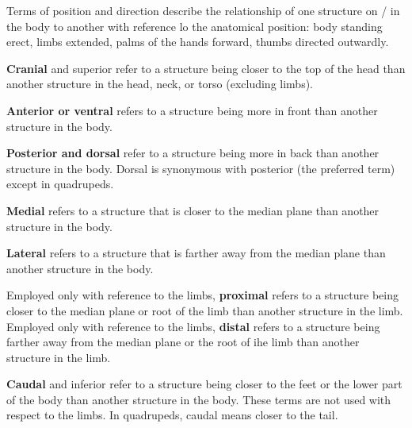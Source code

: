 \areaset[1cm]{18cm}{30cm} \thispagestyle{empty}
\enlargethispage{32pt} \thispagestyle{empty}
\hspace{-0.4cm}
\begin{minipage}{6cm}
	Terms of position and direction describe the relationship of one structure on / in the body to another with reference lo the anatomical position: body standing erect, limbs extended, palms of the hands forward, thumbs directed outwardly. 
	
	\textbf{Cranial} and superior refer to a structure being closer to the top of the head than another structure in the head, neck, or torso (excluding limbs). 
	
	\textbf{Anterior or ventral} refers to a structure being more in front than another structure in the body. 
	
	
	
	\textbf{Posterior and dorsal} refer to a structure being more in back than another structure in the body. Dorsal is synonymous with posterior (the preferred term) except in quadrupeds. 
	
	\textbf{Medial} refers to a structure that is closer to the median plane than another structure in the body. 
	
	\textbf{Lateral} refers to a structure that is farther away from the median plane than another structure in the body.
	
	 Employed only with reference to the limbs, \textbf{proximal} refers to a structure being closer to the median plane or root of the limb than another structure in the limb. Employed only with reference to the limbs, \textbf{distal} refers to a structure being farther away from the median plane or the root of ihe limb than another structure in the limb. 
	 
	 \textbf{Caudal} and inferior refer to a structure being closer to the feet or the lower part of the body than another structure in the body. These terms are not used with respect to the limbs. In quadrupeds, caudal means closer to the tail. 
	 
\end{minipage}
